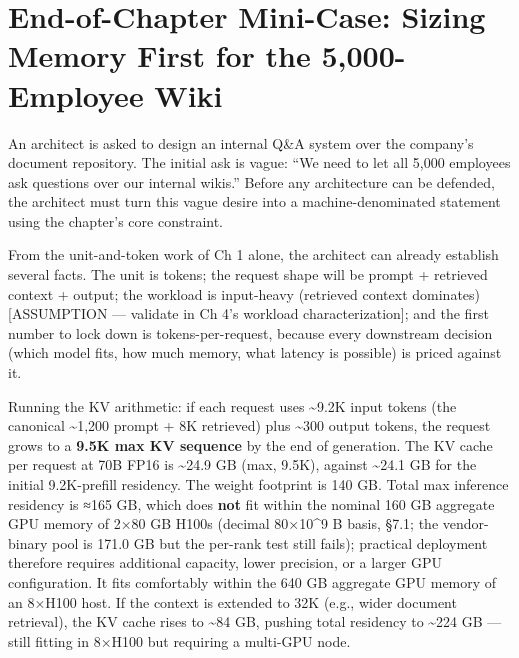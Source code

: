 \section{End-of-Chapter Mini-Case: Sizing Memory First for the
5,000-Employee
Wiki}\label{end-of-chapter-mini-case-sizing-memory-first-for-the-5000-employee-wiki}

An architect is asked to design an internal Q\&A system over the
company's document repository. The initial ask is vague: ``We need to
let all 5,000 employees ask questions over our internal wikis.'' Before
any architecture can be defended, the architect must turn this vague
desire into a machine-denominated statement using the chapter's core
constraint.

From the unit-and-token work of Ch 1 alone, the architect can already
establish several facts. The unit is tokens; the request shape will be
prompt + retrieved context + output; the workload is input-heavy
(retrieved context dominates) {[}ASSUMPTION --- validate in Ch 4's
workload characterization{]}; and the first number to lock down is
tokens-per-request, because every downstream decision (which model fits,
how much memory, what latency is possible) is priced against it.

Running the KV arithmetic: if each request uses \textasciitilde9.2K
input tokens (the canonical \textasciitilde1,200 prompt + 8K retrieved)
plus \textasciitilde300 output tokens, the request grows to a
\textbf{9.5K max KV sequence} by the end of generation. The KV cache per
request at 70B FP16 is \textasciitilde24.9 GB (max, 9.5K), against
\textasciitilde24.1 GB for the initial 9.2K-prefill residency. The
weight footprint is 140 GB. Total max inference residency is ≈165 GB,
which does \textbf{not} fit within the nominal 160 GB aggregate GPU
memory of 2×80 GB H100s (decimal 80×10\^{}9 B basis, §7.1; the
vendor-binary pool is 171.0 GB but the per-rank test still fails);
practical deployment therefore requires additional capacity, lower
precision, or a larger GPU configuration. It fits comfortably within the
640 GB aggregate GPU memory of an 8×H100 host. If the context is
extended to 32K (e.g., wider document retrieval), the KV cache rises to
\textasciitilde84 GB, pushing total residency to \textasciitilde224 GB
--- still fitting in 8×H100 but requiring a multi-GPU node.


